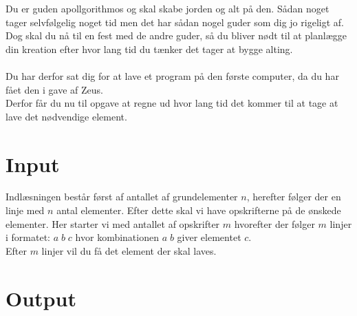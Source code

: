 Du er guden apollgorithmos og skal skabe jorden og alt på den. Sådan noget tager selvfølgelig noget tid men det har sådan nogel guder som dig jo rigeligt af. Dog skal du nå til en fest med de andre guder, så du bliver nødt til at planlægge din kreation efter hvor lang tid du tænker det tager at bygge alting.\\\\
Du har derfor sat dig for at lave et program på den første computer, da du har fået den i gave af Zeus.\\
Derfor får du nu til opgave at regne ud hvor lang tid det kommer til at tage at lave det nødvendige element.
\section*{Input}
Indlæsningen består først af antallet af grundelementer \(n\), herefter følger der en linje med \(n\) antal elementer.
Efter dette skal vi have opskrifterne på de ønskede elementer. Her starter vi med antallet af opskrifter \(m\) hvorefter der følger \(m\) linjer i formatet: \(a\;b\;c\) hvor kombinationen \(a\;b\) giver elementet \(c\).\\
Efter \(m\) linjer vil du få det element der skal laves.
\section*{Output}
